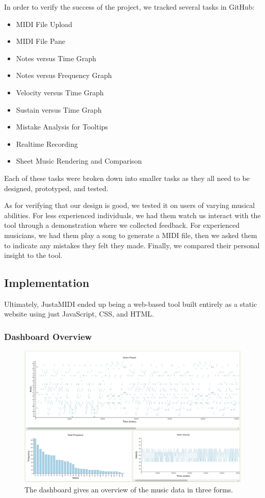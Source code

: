 \documentclass[journal]{vgtc}                %
\begin{document}
In order to verify the success of the project, we tracked several tasks in
GitHub:

\begin{itemize}
  \item MIDI File Upload
  \item MIDI File Pane
  \item Notes versus Time Graph
  \item Notes versus Frequency Graph
  \item Velocity versus Time Graph
  \item Sustain versus Time Graph
  \item Mistake Analysis for Tooltips
  \item Realtime Recording
  \item Sheet Music Rendering and Comparison
\end{itemize}

Each of these tasks were broken down into smaller tasks as they all need to be
designed, prototyped, and tested.

As for verifying that our design is good, we tested it on users of varying musical
abilities. For less experienced individuals, we had them watch us interact with
the tool through a demonstration where we collected feedback. For experienced
musicians, we had them play a song to generate a MIDI file, then we asked them
to indicate any mistakes they felt they made. Finally, we compared their
personal insight to the tool.

\subsection{Implementation}

Ultimately, JustaMIDI ended up being a web-based tool built entirely as a
static website using just JavaScript, CSS, and HTML.

\subsubsection{Dashboard Overview}

\begin{figure}[h]
  \centering
  \includegraphics[width=\columnwidth]{dashboard-single-track}
  \caption{The dashboard gives an overview of the music data in three forms.}
  \label{fig:dashboard}
\end{figure}
\end{document}
